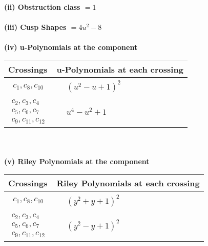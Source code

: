 \documentclass[1p]{elsarticle_modified}
\theoremstyle{definition}
\begin{document}
\flushleft \textbf{(ii) Obstruction class $= 1$}\\~\\
\flushleft \textbf{(iii) Cusp Shapes $= 4 u^2-8$}\\~\\
\newpage\renewcommand{\arraystretch}{1}
\flushleft \textbf{(iv) u-Polynomials at the component}\newline \\
\begin{tabular}{m{50pt}|m{274pt}}
Crossings & \hspace{64pt}u-Polynomials at each crossing \\
\hline $$\begin{aligned}c_{1},c_{8},c_{10}\end{aligned}$$&$\begin{aligned}
&(u^2- u+1)^2
\end{aligned}$\\
\hline $$\begin{aligned}c_{2},c_{3},c_{4}\\c_{5},c_{6},c_{7}\\c_{9},c_{11},c_{12}\end{aligned}$$&$\begin{aligned}
&u^4- u^2+1
\end{aligned}$\\
\hline
\end{tabular}\\~\\
\newpage\renewcommand{\arraystretch}{1}
\flushleft \textbf{(v) Riley Polynomials at the component}\newline \\
\begin{tabular}{m{50pt}|m{274pt}}
Crossings & \hspace{64pt}Riley Polynomials at each crossing \\
\hline $$\begin{aligned}c_{1},c_{8},c_{10}\end{aligned}$$&$\begin{aligned}
&(y^2+y+1)^2
\end{aligned}$\\
\hline $$\begin{aligned}c_{2},c_{3},c_{4}\\c_{5},c_{6},c_{7}\\c_{9},c_{11},c_{12}\end{aligned}$$&$\begin{aligned}
&(y^2- y+1)^2
\end{aligned}$\\
\hline
\end{tabular}\\~\\
\end{document}
